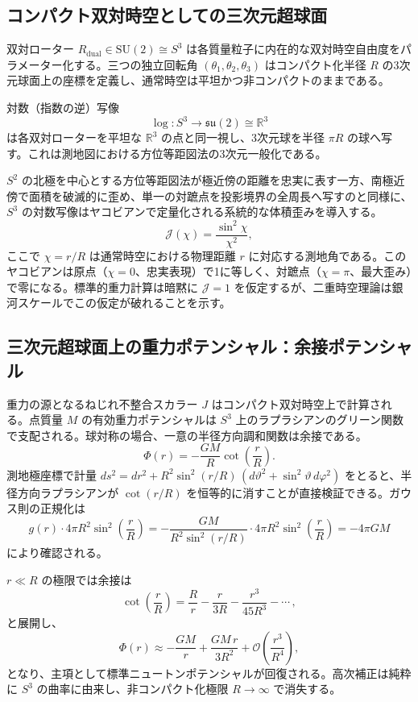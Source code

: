\documentclass[dvipdfmx,a4paper]{article}
\begin{document}
\subsection{コンパクト双対時空としての三次元超球面}

双対ローター $R_{\text{dual}} \in \mathrm{SU}(2) \cong S^3$ は各質量粒子に内在的な双対時空自由度をパラメーター化する。三つの独立回転角 $(\theta_1, \theta_2, \theta_3)$ はコンパクト化半径 $R$ の3次元球面上の座標を定義し、通常時空は平坦かつ非コンパクトのままである。

対数（指数の逆）写像
\[
\log : S^3 \to \mathfrak{su}(2) \cong \mathbb{R}^3
\]
は各双対ローターを平坦な $\mathbb{R}^3$ の点と同一視し、3次元球を半径 $\pi R$ の球へ写す。これは測地図における方位等距図法の3次元一般化である。

$S^2$ の北極を中心とする方位等距図法が極近傍の距離を忠実に表す一方、南極近傍で面積を破滅的に歪め、単一の対蹠点を投影境界の全周長へ写すのと同様に、$S^3$ の対数写像はヤコビアンで定量化される系統的な体積歪みを導入する。
\[
\mathcal{J}(\chi) = \frac{\sin^2 \chi}{\chi^2},
\]
ここで $\chi = r/R$ は通常時空における物理距離 $r$ に対応する測地角である。このヤコビアンは原点（$\chi = 0$、忠実表現）で1に等しく、対蹠点（$\chi = \pi$、最大歪み）で零になる。標準的重力計算は暗黙に $\mathcal{J} = 1$ を仮定するが、二重時空理論は銀河スケールでこの仮定が破れることを示す。

\subsection{三次元超球面上の重力ポテンシャル：余接ポテンシャル}

重力の源となるねじれ不整合スカラー $J$ はコンパクト双対時空上で計算される。点質量 $M$ の有効重力ポテンシャルは $S^3$ 上のラプラシアンのグリーン関数で支配される。球対称の場合、一意の半径方向調和関数は余接である。
\[
\Phi(r) = -\frac{GM}{R}\cot\!\left(\frac{r}{R}\right).
\]
測地極座標で計量 $ds^2 = dr^2 + R^2 \sin^2(r/R)\,(d\vartheta^2 + \sin^2\!\vartheta\, d\varphi^2)$ をとると、半径方向ラプラシアンが $\cot(r/R)$ を恒等的に消すことが直接検証できる。ガウス則の正規化は
\[
g(r) \cdot 4\pi R^2 \sin^2\!\left(\frac{r}{R}\right) = -\frac{GM}{R^2 \sin^2(r/R)} \cdot 4\pi R^2 \sin^2\!\left(\frac{r}{R}\right) = -4\pi GM
\]
により確認される。

$r \ll R$ の極限では余接は
\[
\cot\!\left(\frac{r}{R}\right) = \frac{R}{r} - \frac{r}{3R} - \frac{r^3}{45R^3} - \cdots\,,
\]
と展開し、
\[
\Phi(r) \approx -\frac{GM}{r} + \frac{GM\,r}{3R^2} + \mathcal{O}\!\left(\frac{r^3}{R^4}\right),
\]
となり、主項として標準ニュートンポテンシャルが回復される。高次補正は純粋に $S^3$ の曲率に由来し、非コンパクト化極限 $R \to \infty$ で消失する。
\end{document}
